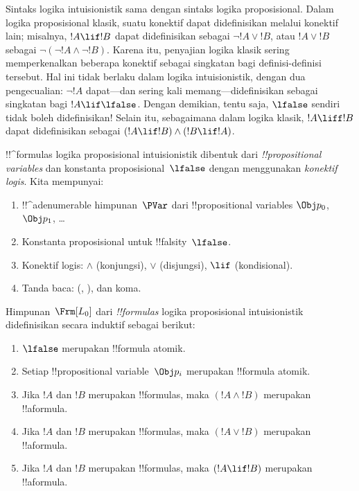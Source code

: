 \documentclass[../../../include/open-logic-section]{subfiles}
\begin{document}


Sintaks logika intuisionistik sama dengan sintaks logika proposisional.
Dalam logika proposisional klasik, suatu konektif dapat didefinisikan melalui
konektif lain; misalnya, $!A \lif !B$ dapat didefinisikan sebagai $\lnot !A
\lor !B$, atau $!A \lor !B$ sebagai $\lnot(\lnot !A \land \lnot !B)$. Karena
itu, penyajian logika klasik sering memperkenalkan beberapa konektif sebagai
singkatan bagi definisi-definisi tersebut. Hal ini tidak berlaku dalam logika
intuisionistik, dengan dua pengecualian: $\lnot !A$ dapat---dan sering kali
memang---didefinisikan sebagai singkatan bagi $!A \lif \lfalse$. Dengan
demikian, tentu saja, $\lfalse$ sendiri tidak boleh didefinisikan!{} Selain
itu, sebagaimana dalam logika klasik, $!A \liff !B$ dapat didefinisikan sebagai
$(!A \lif !B) \land (!B \lif !A)$.

!!^{formula}s logika proposisional intuisionistik dibentuk dari
\emph{!!{propositional variable}s} dan konstanta proposisional~$\lfalse$
dengan menggunakan \emph{konektif logis}. Kita mempunyai:

\begin{enumerate}
\item !!^a{denumerable} himpunan~$\PVar$ dari !!{propositional variable}s
  $\Obj p_0$, $\Obj p_1$, \dots
\item Konstanta proposisional untuk !!{falsity}~$\lfalse$.
\item Konektif logis: $\land$ (konjungsi), $\lor$ (disjungsi), $\lif$
  (kondisional).
\item Tanda baca: (, ), dan koma.
\end{enumerate}

\begin{defn}[Formula]
 Himpunan~$\Frm[L_0]$ dari \emph{!!{formula}s}
logika proposisional intuisionistik didefinisikan secara induktif sebagai
berikut:
\begin{enumerate}
\item $\lfalse$ merupakan !!{formula} atomik.

\item Setiap !!{propositional variable}~$\Obj p_i$ merupakan !!{formula}
  atomik.

\item Jika $!A$ dan $!B$ merupakan !!{formula}s, maka $(!A \land !B)$
  merupakan !!a{formula}.

\item Jika $!A$ dan $!B$ merupakan !!{formula}s, maka $(!A \lor !B)$
  merupakan !!a{formula}.

\item Jika $!A$ dan $!B$ merupakan !!{formula}s, maka $(!A \lif !B)$
  merupakan !!a{formula}.

\end{enumerate}
\end{defn}
\end{document}
